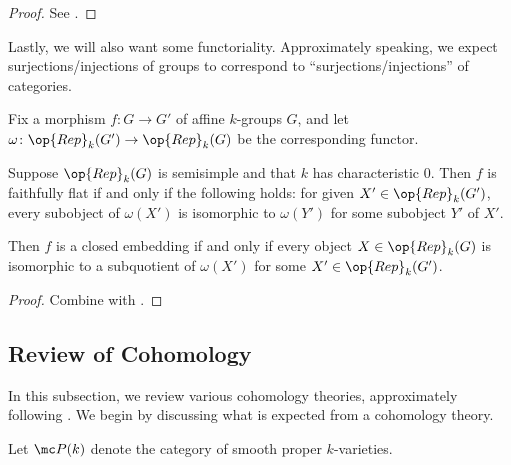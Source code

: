\documentclass{article}
\begin{document}
\begin{proof}
	See \cite[Remark~2.28]{milne-tannakian}.
\end{proof}
Lastly, we will also want some functoriality. Approximately speaking, we expect surjections/injections of groups to correspond to ``surjections/injections'' of categories.
\begin{proposition}
	Fix a morphism $f\colon G\to G'$ of affine $k$-groups $G$, and let $\omega\colon\op{Rep}_k(G')\to\op{Rep}_k(G)$ be the corresponding functor.
	\begin{listalph}
		\item Suppose $\op{Rep}_k(G)$ is semisimple and that $k$ has characteristic $0$. Then $f$ is faithfully flat if and only if the following holds: for given $X'\in\op{Rep}_k(G')$, every subobject of $\omega(X')$ is isomorphic to $\omega(Y')$ for some subobject $Y'$ of $X'$.
		\item Then $f$ is a closed embedding if and only if every object $X\in\op{Rep}_k(G)$ is isomorphic to a subquotient of $\omega(X')$ for some $X'\in\op{Rep}_k(G')$.
	\end{listalph}
\end{proposition}
\begin{proof}
	Combine \cite[Remark~2.29]{milne-tannakian} with \cite[Proposition~2.21]{milne-tannakian}.
\end{proof}

\subsection{Review of Cohomology}
In this subsection, we review various cohomology theories, approximately following \cite[Section~1]{deligne-hodge}. We begin by discussing what is expected from a cohomology theory.
\begin{definition}
	Let $\mc P(k)$ denote the category of smooth proper $k$-varieties. \todo{}
\end{definition}
\end{document}
